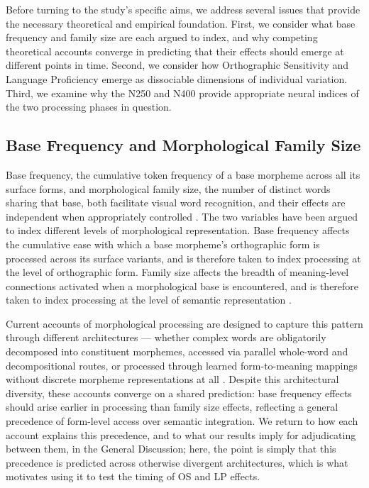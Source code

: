 Before turning to the study's specific aims, we address several issues that provide the necessary theoretical and empirical foundation. First, we consider what base frequency and family size are each argued to index, and why competing theoretical accounts converge in predicting that their effects should emerge at different points in time. Second, we consider how Orthographic Sensitivity and Language Proficiency emerge as dissociable dimensions of individual variation. Third, we examine why the N250 and N400 provide appropriate neural indices of the two processing phases in question.

\subsection{Base Frequency and Morphological Family Size}

Base frequency, the cumulative token frequency of a base morpheme across all its surface forms, and morphological family size, the number of distinct words sharing that base, both facilitate visual word recognition, and their effects are independent when appropriately controlled \citep{fordDerivationalMorphologyBase2010}. The two variables have been argued to index different levels of morphological representation. Base frequency affects the cumulative ease with which a base morpheme's orthographic form is processed across its surface variants, and is therefore taken to index processing at the level of orthographic form. Family size affects the breadth of meaning-level connections activated when a morphological base is encountered, and is therefore taken to index processing at the level of semantic representation \citep{schreuderHowComplexSimplex1997, taftMorphologicalDecompositionReverse2004, taftRecognitionAffixedWords1979, dejongMorphologicalFamilySize2000, bertramEffectsFamilySize2000}.

Current accounts of morphological processing are designed to capture this pattern through different architectures — whether complex words are obligatorily decomposed into constituent morphemes, accessed via parallel whole-word and decompositional routes, or processed through learned form-to-meaning mappings without discrete morpheme representations at all \citep{schreuderModelingMorphologicalProcessing1995, dejongMorphologicalFamilySize2000, taft_lexical_1975, taftMorphologicalDecompositionReverse2004, rastleMorphologicalDecompositionBased2008, longtinMorphologicalDecompositionEarly2005, morrisSemanticTransparencyMasked2007, chuangDiscriminativeLearningLexicon}. Despite this architectural diversity, these accounts converge on a shared prediction: base frequency effects should arise earlier in processing than family size effects, reflecting a general precedence of form-level access over semantic integration. We return to how each account explains this precedence, and to what our results imply for adjudicating between them, in the General Discussion; here, the point is simply that this precedence is predicted across otherwise divergent architectures, which is what motivates using it to test the timing of OS and LP effects.


